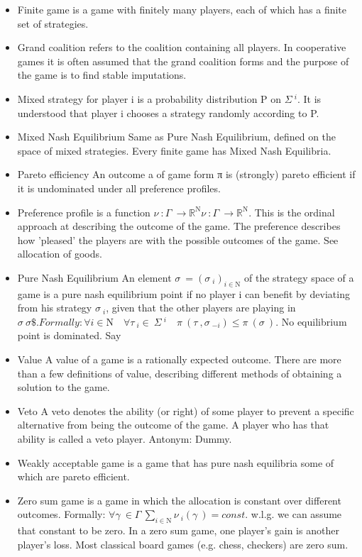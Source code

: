 \documentclass[]{report}
\begin{document}
\begin{itemize}
	\item Finite game 
	is a game with finitely many players, each of which has a finite set of strategies.
\item Grand coalition 
	refers to the coalition containing all players. In cooperative games it is often assumed that the grand coalition forms and the purpose of the game is to find stable imputations.
\item Mixed strategy 
	for player i is a probability distribution P on ${\displaystyle \Sigma \ ^{i}}$. It is understood that player i chooses a strategy randomly according to P.
\item Mixed Nash Equilibrium 
	Same as Pure Nash Equilibrium, defined on the space of mixed strategies. Every finite game has Mixed Nash Equilibria.
	\item Pareto efficiency 
	An outcome a of game form π is (strongly) pareto efficient if it is undominated under all preference profiles.
	\item Preference profile 
	is a function ${\displaystyle \nu \ :\Gamma \ \to \mathbb {R} ^{\mathrm {N} }} \nu \ :\Gamma \ \to \mathbb {R} ^{\mathrm {N} }$. This is the ordinal approach at describing the outcome of the game. The preference describes how 'pleased' the players are with the possible outcomes of the game. See allocation of goods.
	\item Pure Nash Equilibrium 
	An element ${\displaystyle \sigma \ =(\sigma \ _{i})_{i\in \mathrm {N} }}$ of the strategy space of a game is a pure nash equilibrium point if no player i can benefit by deviating from his strategy ${\displaystyle \sigma \ _{i}}$, given that the other players are playing in ${\displaystyle \sigma \ } \sigma \$ . Formally:
	{\displaystyle \forall i\in \mathrm {N} \quad \forall \tau \ _{i}\in \ \Sigma \ ^{i}\quad \pi \ (\tau \ ,\sigma \ _{-i})\leq \pi \ (\sigma \ )}$.
	No equilibrium point is dominated.
	Say 
	
	\item Value 
	A value of a game is a rationally expected outcome. There are more than a few definitions of value, describing different methods of obtaining a solution to the game.
	\item Veto 
	A veto denotes the ability (or right) of some player to prevent a specific alternative from being the outcome of the game. A player who has that ability is called a veto player.
	Antonym: Dummy.
	
	\item Weakly acceptable game 
	is a game that has pure nash equilibria some of which are pareto efficient.
	\item Zero sum game 
	is a game in which the allocation is constant over different outcomes. Formally:
	${\displaystyle \forall \gamma \ \in \Gamma \ \sum _{i\in \mathrm {N} }\nu \ _{i}(\gamma \ )=const.} $
	w.l.g. we can assume that constant to be zero. In a zero sum game, one player's gain is another player's loss. Most classical board games (e.g. chess, checkers) are zero sum.
	
\end{itemize}


	
\end{document}
